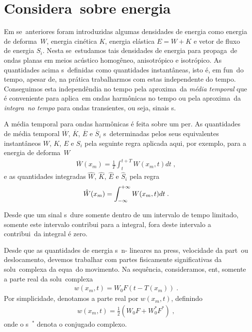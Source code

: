 
\section{Considera\coes\ sobre energia}

Em se\coes\ anteriores foram introduzidas algumas
densidades de energia como energia de deforma\cao\
$W$, energia cin\'etica $K$, energia el\'astica
$E=W+K$ e vetor de fluxo de energia $S_i$. Nesta
se\cao\ estudamos tais densidades de energia para
propaga\coes\ de ondas planas em meios ac\'ustico
homog\^eneo, anisotr\'opico e isotr\'opico. As
quantidades acima s\ao\ definidas como quantidades
instant\^aneas, isto \'e, em fun\cao\ do tempo,
apesar de, na pr\'atica trabalharmos com estas
independente do tempo. Conseguimos esta
independ\^endia no tempo pela aproxima\cao\ da
{\it m\'edia temporal} que \'e conveniente para
aplica\coes\ em ondas harm\^onicas no tempo ou
pela aproxima\cao\ da {\it integra\cao\ no tempo}
para ondas transientes, ou seja, sinais s\ismicos.

A m\'edia temporal para ondas harm\^onicas \'e feita
sobre um per\iodo. As quantidades de m\'edia temporal 
$\overline{W}$, $\overline{K}$, $\overline{E}$ e
$\overline{S}_i$ s\ao\ determinadas pelos
seus equivalentes instant\^aneos $W$, $K$, $E$ e
${S_i}$ pela seguinte regra aplicada aqui, por
exemplo, para a energia de deforma\cao\ $W$
\begin{eqnarray}
\overline{W}(x_m) = \frac{1}{T} \int_{t}^{t+T}
W(x_m,t) dt \; ,
\end{eqnarray}
e as quantidades integradas $\hat{W}$, $\hat{K}$,
$\hat{E}$ e $\hat{S}_i$ pela regra
\begin{eqnarray}
\hat{W}(x_m) = \int_{-\infty}^{+\infty} W(x_m,t) dt \; .
\end{eqnarray}

Desde que um sinal s\ismico\ dure somente dentro de
um intervalo de tempo limitado, somente este
intervalo contribui para a integral, fora deste
intervalo a contribui\cao\ da integral \'e zero.

Desde que as quantidades de energia s\ao\  n\ao-%
lineares na press\ao, velocidade da part\icula\ ou
deslocamento, devemos trabalhar com partes
fisicamente significativas da solu\cao\ complexa
da equa\cao\ do movimento. Na sequ\^encia, consideramos,
ent\ao, somente a parte real da solu\cao\ complexa
\begin{eqnarray*}
w(x_m,t) = W_0 F(t-T(x_m)) \; .
\end{eqnarray*} 
Por simplicidade, denotamos a parte real por
$w(x_m,t)$, definindo
\begin{eqnarray*}
w(x_m,t) = \frac{1}{2}(W_0F +W_0^{*}F^{*}) \; ,
\end{eqnarray*}
onde o s\imbolo\ $^{*}$ denota o conjugado complexo.


